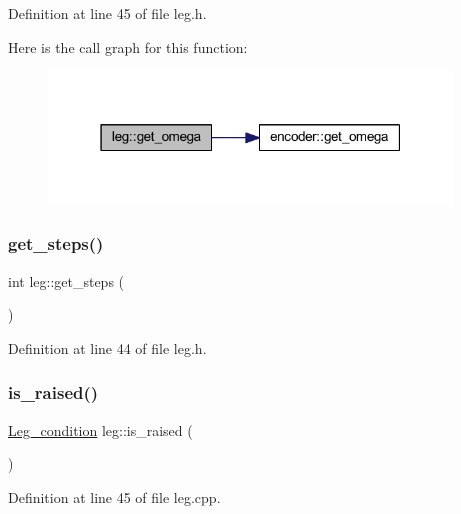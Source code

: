 Definition at line 45 of file leg.\+h.

Here is the call graph for this function\+:
\nopagebreak
\begin{figure}[H]
\begin{center}
\leavevmode
\includegraphics[width=304pt]{classleg_a90a92add134cc7f610202ae703ed8857_cgraph}
\end{center}
\end{figure}
\mbox{\label{classleg_a36761ba08ae602b76c4adf168d2ae531}} 
\subsubsection{\texorpdfstring{get\_steps()}{get\_steps()}}
{\footnotesize\ttfamily int leg\+::get\+\_\+steps (\begin{DoxyParamCaption}{ }\end{DoxyParamCaption})\hspace{0.3cm}{\ttfamily [inline]}}



Definition at line 44 of file leg.\+h.

\mbox{\label{classleg_a24893e209229c5a70d748f2471cd4370}} 
\subsubsection{\texorpdfstring{is\_raised()}{is\_raised()}}
{\footnotesize\ttfamily \mbox{\hyperlink{leg_8h_acd2839a3551530e84aeae79009128ae0}{Leg\+\_\+condition}} leg\+::is\+\_\+raised (\begin{DoxyParamCaption}{ }\end{DoxyParamCaption})}



Definition at line 45 of file leg.\+cpp.

